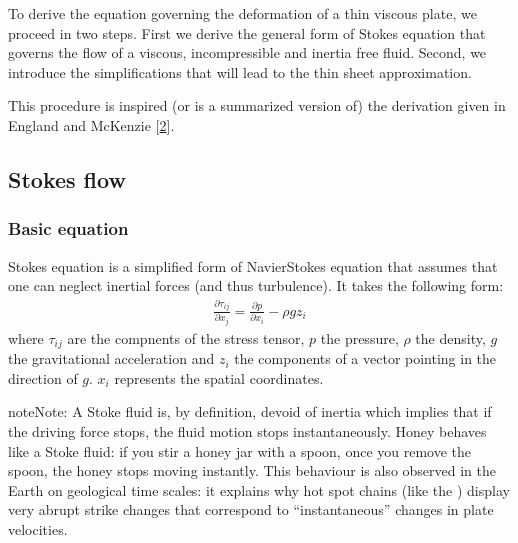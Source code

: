 \documentclass[letterpaper,10pt,english]{jupyterBook}
\begin{document}
\sphinxAtStartPar
To derive the equation governing the deformation of a thin viscous plate, we proceed in two steps. First we derive the general form of Stokes equation that governs the flow of a viscous, incompressible and inertia free fluid. Second, we introduce the simplifications that will lead to the thin sheet approximation.

\sphinxAtStartPar
This procedure is inspired (or is a summarized version of) the derivation given in England and McKenzie {[}\hyperlink{cite.references:id6}{2}{]}.

\sphinxstepscope


\subsection{Stokes flow}
\label{\detokenize{stokes:stokes-flow}}\label{\detokenize{stokes:stokes-section}}\label{\detokenize{stokes::doc}}

\subsubsection{Basic equation}
\label{\detokenize{stokes:basic-equation}}
\sphinxAtStartPar
Stokes equation is a simplified form of Navier\sphinxhyphen{}Stokes equation that assumes that one can neglect inertial forces (and thus turbulence). It takes the following form:
\begin{equation}\label{equation:stokes:stokes-force}
\begin{split}\frac{\partial\tau_{ij}}{\partial x_j}=\frac{\partial p}{\partial x_i}-\rho gz_i\end{split}
\end{equation}
\sphinxAtStartPar
where \(\tau_{ij}\) are the compnents of the stress tensor, \(p\) the pressure, \(\rho\) the density, \(g\) the gravitational acceleration and \(z_i\) the components of a vector pointing in the direction of \(g\). \(x_i\) represents the spatial coordinates.

\begin{sphinxadmonition}{note}{Note:}
\sphinxAtStartPar
A Stoke fluid is, by definition, devoid of inertia which implies that if the driving force stops, the fluid motion stops instantaneously. Honey behaves like a Stoke fluid: if you stir a honey jar with a spoon, once you remove the spoon, the honey stops moving instantly. This behaviour is also observed in the Earth on geological time scales: it explains why hot spot chains (like the ) display very abrupt strike changes that correspond to “instantaneous” changes in plate velocities.
\end{sphinxadmonition}
\end{document}
